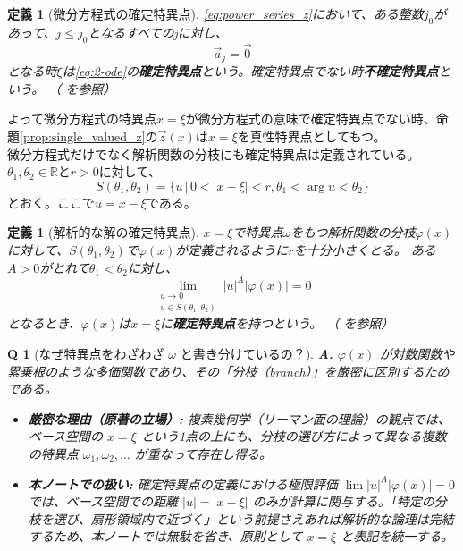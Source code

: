 \documentclass[paper=a4, fontsize=11pt]{jlreq} %
\theoremstyle{break}
\newtheorem{definition}[theorem]{定義}
\theoremstyle{qa}
\newtheorem*{Q}{Q}
\theoremstyle{remark} %
\begin{document}
\begin{definition}[微分方程式の確定特異点]
    \eqref{eq:power_series_z}において、ある整数$j_{0}$があって、$j\leq j_{0}$となるすべてのjに対し、
    \[
    \vec{a}_{j} = \vec{0}
    \]
    となる時$\xi$は\eqref{eq:2-ode}の\textbf{確定特異点}という。確定特異点でない時\textbf{不確定特異点}という。
    （\cite[p.59 定義2.4]{book:okamoto} を参照）
\end{definition}

よって微分方程式の特異点$x=\xi$が微分方程式の意味で確定特異点でない時、命題\ref{prop:single_valued_z}の$\vec{z}(x)$は$x=\xi$を真性特異点としてもつ。\\

微分方程式だけでなく解析関数の分枝にも確定特異点は定義されている。\\
$\theta_{1},\theta_{2}\in\mathbb{R}$と$r>0$に対して、
\[
S(\theta_{1},\theta_{2}) = \{u\,|\, 0<|x-\xi|<r, \theta_{1} < \arg u < \theta_{2} \}
\]
とおく。ここで$u=x-\xi$である。

\begin{definition}[解析的な解の確定特異点]
    $x=\xi$で特異点$\omega$をもつ解析関数の分枝$\varphi(x)$に対して、$S(\theta_{1},\theta_{2})$で$\varphi(x)$が定義されるように$r$を十分小さくとる。
    ある$A>0$がとれて$\theta_{1}<\theta_{2}$に対し、
    \[
    \lim_{\substack{u\to 0 \\ u\in S(\theta_{1},\theta_{2})}}|u|^{A}|\varphi(x)| = 0
    \]
    となるとき、$\varphi(x)$は$x=\xi$に\textbf{確定特異点}を持つという。
    （\cite[p.60 定義2.5]{book:okamoto} を参照）
\end{definition}

\begin{Q}[なぜ特異点をわざわざ $\omega$ と書き分けているの？]
\textbf{A.} $\varphi(x)$ が対数関数や累乗根のような多価関数であり、その「分枝（branch）」を厳密に区別するためである。
\begin{itemize}
    \item \textbf{厳密な理由（原著の立場）:} 複素幾何学（リーマン面の理論）の観点では、ベース空間の $x=\xi$ という1点の上にも、分枝の選び方によって異なる複数の特異点 $\omega_1, \omega_2, \dots$ が重なって存在し得る。
    \item \textbf{本ノートでの扱い:} 確定特異点の定義における極限評価 $\lim |u|^A|\varphi(x)|=0$ では、ベース空間での距離 $|u| = |x-\xi|$ のみが計算に関与する。「特定の分枝を選び、扇形領域内で近づく」という前提さえあれば解析的な論理は完結するため、本ノートでは無駄を省き、原則として $x=\xi$ と表記を統一する。
\end{itemize}
\end{Q}
\end{document}
